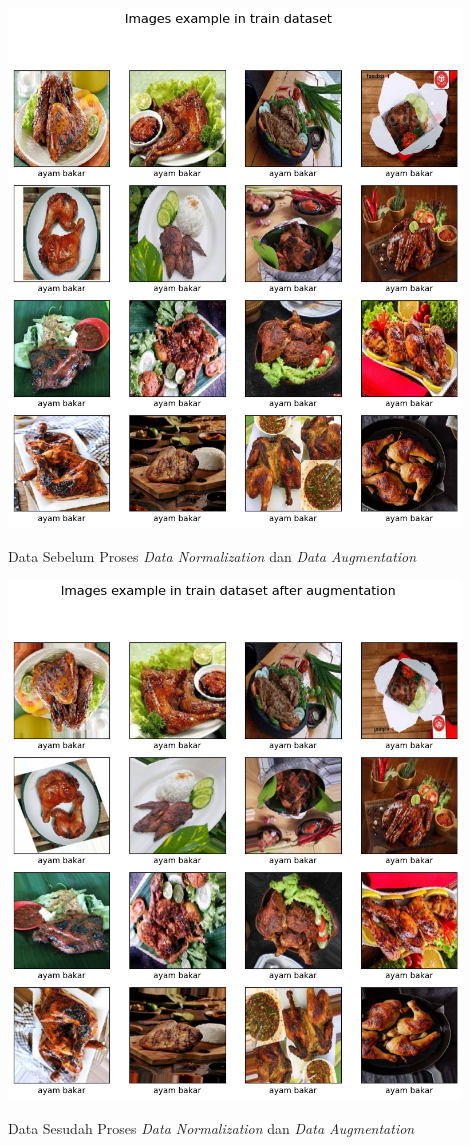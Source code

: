\begin{afigure}
    \includegraphics[height=0.6\textheight, width=0.9\textwidth, center]{images/raw-dataset.png}
    \caption{Data Sebelum Proses \textit{Data Normalization} dan \textit{Data Augmentation}}
    \label{fig:sebelum-augmentasi}
\end{afigure}

\begin{afigure}
    \includegraphics[height=0.6\textheight, width=0.9\textwidth, center]{images/augmented.png}
    \caption{Data Sesudah Proses \textit{Data Normalization} dan \textit{Data Augmentation}}
    \label{fig:sesudah-augmentasi}
\end{afigure}

